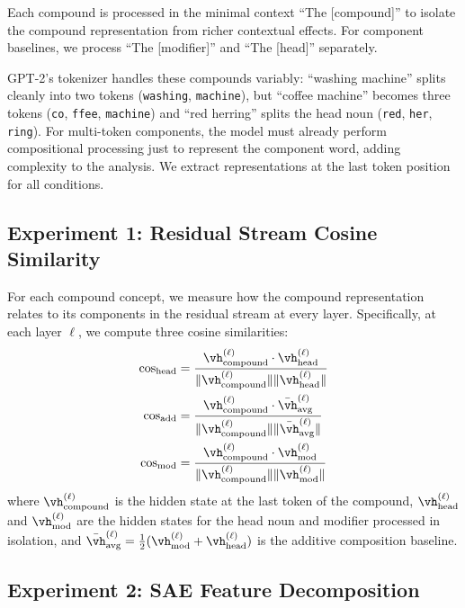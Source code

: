 Each compound is processed in the minimal context ``The [compound]'' to isolate the compound representation from richer contextual effects.
For component baselines, we process ``The [modifier]'' and ``The [head]'' separately.

GPT-2's \BPE tokenizer handles these compounds variably: ``washing machine'' splits cleanly into two tokens (\texttt{washing}, \texttt{\textvisiblespace machine}), but ``coffee machine'' becomes three tokens (\texttt{co}, \texttt{ffee}, \texttt{\textvisiblespace machine}) and ``red herring'' splits the head noun (\texttt{red}, \texttt{\textvisiblespace her}, \texttt{ring}).
For multi-token components, the model must already perform compositional processing just to represent the component word, adding complexity to the analysis.
We extract representations at the last token position for all conditions.

\subsection{Experiment 1: Residual Stream Cosine Similarity}
\label{sec:exp1}

For each compound concept, we measure how the compound representation relates to its components in the residual stream at every layer.
Specifically, at each layer $\ell$, we compute three cosine similarities:
\begin{align}
    \cossim_{\text{head}} &= \frac{\vh^{(\ell)}_{\compound} \cdot \vh^{(\ell)}_{\text{head}}}{\|\vh^{(\ell)}_{\compound}\| \|\vh^{(\ell)}_{\text{head}}\|} \label{eq:cos_head} \\
    \cossim_{\text{add}} &= \frac{\vh^{(\ell)}_{\compound} \cdot \bar{\vh}^{(\ell)}_{\text{avg}}}{\|\vh^{(\ell)}_{\compound}\| \|\bar{\vh}^{(\ell)}_{\text{avg}}\|} \label{eq:cos_add} \\
    \cossim_{\text{mod}} &= \frac{\vh^{(\ell)}_{\compound} \cdot \vh^{(\ell)}_{\text{mod}}}{\|\vh^{(\ell)}_{\compound}\| \|\vh^{(\ell)}_{\text{mod}}\|} \label{eq:cos_mod}
\end{align}
where $\vh^{(\ell)}_{\compound}$ is the hidden state at the last token of the compound, $\vh^{(\ell)}_{\text{head}}$ and $\vh^{(\ell)}_{\text{mod}}$ are the hidden states for the head noun and modifier processed in isolation, and $\bar{\vh}^{(\ell)}_{\text{avg}} = \frac{1}{2}(\vh^{(\ell)}_{\text{mod}} + \vh^{(\ell)}_{\text{head}})$ is the additive composition baseline.

\subsection{Experiment 2: SAE Feature Decomposition}
\label{sec:exp2}

